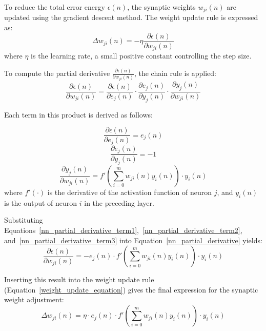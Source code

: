 To reduce the total error energy $\epsilon(n)$, the synaptic weights $w_{ji}(n)$ are updated using the gradient descent method. The weight update rule is expressed as:
\begin{equation} \label{weight_update_equation}
	\Delta w_{ji}(n) = -\eta \frac{\partial \epsilon(n)}{\partial w_{ji}(n)}
\end{equation}
where $\eta$ is the learning rate, a small positive constant controlling the step size.

To compute the partial derivative $\frac{\partial \epsilon(n)}{\partial w_{ji}(n)}$, the chain rule is applied:
\begin{equation} \label{nn_partial_derivative}
	\frac{\partial \epsilon(n)}{\partial w_{ji}(n)} =
	\frac{\partial \epsilon(n)}{\partial e_j(n)} \cdot
	\frac{\partial e_j(n)}{\partial y_j(n)} \cdot
	\frac{\partial y_j(n)}{\partial w_{ji}(n)}
\end{equation}

Each term in this product is derived as follows:

\begin{equation} \label{nn_partial_derivative_term1}
	\frac{\partial \epsilon(n)}{\partial e_j(n)} = e_j(n)
\end{equation}
\begin{equation} \label{nn_partial_derivative_term2}
	\frac{\partial e_j(n)}{\partial y_j(n)} = -1
\end{equation}
\begin{equation} \label{nn_partial_derivative_term3}
	\frac{\partial y_j(n)}{\partial w_{ji}(n)} =
	f'\left(\sum_{i=0}^{m} w_{ji}(n) y_i(n)\right) \cdot y_i(n)
\end{equation}
where $f'(\cdot)$ is the derivative of the activation function of neuron $j$, and $y_i(n)$ is the output of neuron $i$ in the preceding layer.

Substituting Equations~\ref{nn_partial_derivative_term1},~\ref{nn_partial_derivative_term2}, and~\ref{nn_partial_derivative_term3} into Equation~\ref{nn_partial_derivative} yields:
\begin{equation}
	\frac{\partial \epsilon(n)}{\partial w_{ji}(n)} =
	-e_j(n) \cdot f'\left(\sum_{i=0}^{m} w_{ji}(n) y_i(n)\right) \cdot y_i(n)
\end{equation}

Inserting this result into the weight update rule (Equation~\ref{weight_update_equation}) gives the final expression for the synaptic weight adjustment:
\begin{equation}
	\Delta w_{ji}(n) = \eta \cdot e_j(n) \cdot f'\left(\sum_{i=0}^{m} w_{ji}(n) y_i(n)\right) \cdot y_i(n)
\end{equation}

